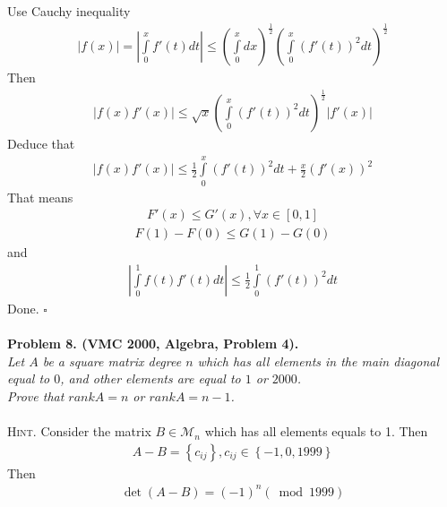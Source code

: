 \documentclass{article}
\numberwithin{equation}{section}
\begin{document}
Use Cauchy inequality
\begin{align}
\left| {f\left( x \right)} \right| = \left| {\int\limits_0^x {f'\left( t \right)} dt} \right| \le {\left( {\int\limits_0^x {dx} } \right)^{\frac{1}{2}}}{\left( {\int\limits_0^x {{{\left( {f'\left( t \right)} \right)}^2}} dt} \right)^{\frac{1}{2}}}
\end{align}
Then 
\begin{align}
\left| {f\left( x \right)f'\left( x \right)} \right| \le \sqrt x {\left( {\int\limits_0^x {{{\left( {f'\left( t \right)} \right)}^2}} dt} \right)^{\frac{1}{2}}}\left| {f'\left( x \right)} \right|
\end{align}
Deduce that
\begin{align}
\left| {f\left( x \right)f'\left( x \right)} \right| \le \frac{1}{2}\int\limits_0^x {{{\left( {f'\left( t \right)} \right)}^2}dt}  + \frac{x}{2}{\left( {f'\left( x \right)} \right)^2}
\end{align}
That means
\begin{align}
F'\left( x \right) \le G'\left( x \right),\forall x \in \left[ {0,1} \right]
\end{align}
\begin{align}
F\left( 1 \right) - F\left( 0 \right) \le G\left( 1 \right) - G\left( 0 \right)
\end{align}
and
\begin{align}
\left| {\int\limits_0^1 {f\left( t \right)f'\left( t \right)} dt} \right| \le \frac{1}{2}\int\limits_0^1 {{{\left( {f'\left( t \right)} \right)}^2}} dt
\end{align}
Done. \hfill $\square$\\
\\
\textbf{Problem 8. (VMC 2000, Algebra, Problem 4).}\\
\textit{Let $A$ be a square matrix degree $n$ which has all elements in the main diagonal equal to $0$, and other elements are equal to $1$ or $2000$.\\
Prove that $rank A = n$ or $rank A = n-1$.}\\
\\
\textsc{Hint.} Consider the matrix $B \in {\mathcal{M}_n}$ which has all elements equals to 1. Then 
\begin{align}
A - B = \left\{ {{c_{ij}}} \right\},{c_{ij}} \in \left\{ { - 1,0,1999} \right\}
\end{align}
Then 
\begin{align}
\det \left( {A - B} \right) = {\left( { - 1} \right)^n}\left( {\bmod 1999} \right)
\end{align}
\end{document}
